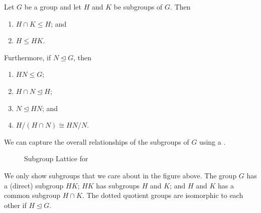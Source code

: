 \begin{theorem}[Isomorphism II]\label{thrm-isomorphism-2}
    Let $G$ be a group and let $H$ and $K$ be subgroups of $G$. Then
    \begin{enumerate}
        \item $H \cap K \leq H$; and
        \item $H \leq HK$.
    \end{enumerate}
    Furthermore, if $N \unlhd G$, then
    \begin{enumerate}[start=3]
        \item $HN \leq G$;
        \item $H \cap N \unlhd H$;
        \item $N \unlhd HN$; and
        \item $H / (H\cap N) \cong HN / N$.
    \end{enumerate}
\end{theorem}

We can capture the overall relationships of the subgroups of $G$ using a .



\begin{figure}[H]
    \centering
    \caption{Subgroup Lattice for }
\end{figure}

We only show subgroups that we care about in the figure above. The group $G$ has a (direct) subgroup $HK$; $HK$ has subgroups $H$ and $K$; and $H$ and $K$ has a common subgroup $H\cap K$. The dotted quotient groups are isomorphic to each other if $H \unlhd G$.

